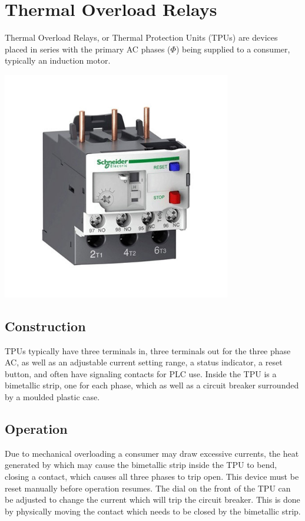 \documentclass[11pt,a4paper]{article}
\begin{document}
\section{Thermal Overload Relays}
Thermal Overload Relays, or Thermal Protection Units (TPUs) are devices placed in series with the primary AC phases ($\Phi$) being supplied to a consumer, typically an induction motor.
\begin{center}
\includegraphics[width=10cm]{thermal}
\end{center}
\subsection*{Construction}
TPUs typically have three terminals in, three terminals out for the three phase AC, as well as an adjustable current setting range, a status indicator, a reset button, and often have signaling contacts for PLC use. Inside the TPU is a bimetallic strip, one for each phase, which as well as a circuit breaker surrounded by a moulded plastic case.
\subsection*{Operation}
Due to mechanical overloading a consumer may draw excessive currents, the heat generated by which may cause the bimetallic strip inside the TPU to bend, closing a contact, which causes all three phases to trip open. This device must be reset manually before operation resumes. The dial on the front of the TPU can be adjusted to change the current which will trip the circuit breaker. This is done by physically moving the contact which needs to be closed by the bimetallic strip.
\end{document}
